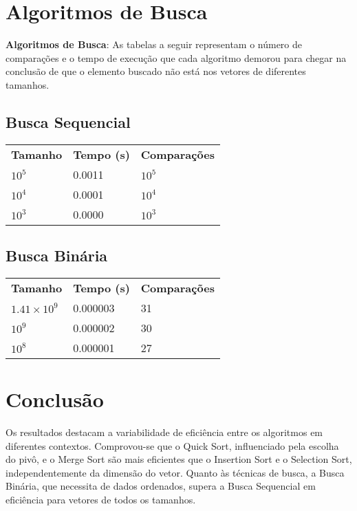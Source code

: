\documentclass[conference]{IEEEtran}
\begin{document}
\section{Algoritmos de Busca}

\textbf{Algoritmos de Busca}: As tabelas a seguir representam o número de comparações e o tempo de execução que cada algoritmo demorou para chegar na conclusão de que o elemento buscado não está nos vetores de diferentes tamanhos.

\subsection*{Busca Sequencial}
\begin{tabularx}{0.5\textwidth}{X|X|X}
\hline
\textbf{Tamanho} & \textbf{Tempo (s)} & \textbf{Comparações} \\

$10^5$ & 0.0011 & $10^5$ \\

$10^4$ & 0.0001 & $10^4$ \\

$10^3$ & 0.0000 & $10^3$ \\
\hline
\end{tabularx}
\hspace{1cm} %

\subsection*{Busca Binária}
\begin{tabularx}{0.5\textwidth}{X|X|X}
\hline
\textbf{Tamanho} & \textbf{Tempo (s)} & \textbf{Comparações} \\

$1.41\times10^9$ & 0.000003 & 31 \\

$10^9$ & 0.000002 & 30 \\

$10^8$ & 0.000001 & 27 \\
\hline
\end{tabularx}

\vspace{0.5cm}

\section{Conclusão}
Os resultados destacam a variabilidade de eficiência entre os algoritmos em diferentes contextos. Comprovou-se que o Quick Sort, influenciado pela escolha do pivô, e o Merge Sort são mais eficientes que o Insertion Sort e o Selection Sort, independentemente da dimensão do vetor. Quanto às técnicas de busca, a Busca Binária, que necessita de dados ordenados, supera a Busca Sequencial em eficiência para vetores de todos os tamanhos.
\end{document}
